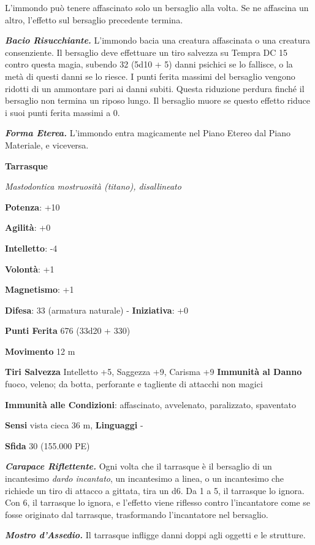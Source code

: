 \begin{multicols}{2}
L'immondo può tenere affascinato solo un bersaglio alla volta. Se ne
affascina un altro, l'effetto sul bersaglio precedente termina.

\emph{\textbf{Bacio Risucchiante.}} L'immondo bacia una creatura
affascinata o una creatura consenziente. Il bersaglio deve effettuare un
tiro salvezza su Tempra DC 15 contro questa magia, subendo 32
(5d10 + 5) danni psichici se lo fallisce, o la metà di questi danni se
lo riesce. I punti ferita massimi del bersaglio vengono ridotti di un
ammontare pari ai danni subiti. Questa riduzione perdura finché il
bersaglio non termina un riposo lungo. Il bersaglio muore se questo
effetto riduce i suoi punti ferita massimi a 0.

\emph{\textbf{Forma Eterea.}} L'immondo entra magicamente nel Piano
Etereo dal Piano Materiale, e viceversa.

\textbf{Tarrasque}

\emph{Mastodontica mostruosità (titano), disallineato}

\textbf{Potenza}: +10

\textbf{Agilità}: +0

\textbf{Intelletto}: -4

\textbf{Volontà}: +1

\textbf{Magnetismo}: +1

\textbf{Difesa}: 33 (armatura naturale) - \textbf{Iniziativa}: +0

\textbf{Punti Ferita} 676 (33d20 + 330)

\textbf{Movimento} 12 m

\textbf{Tiri Salvezza} Intelletto +5, Saggezza +9, Carisma +9
\textbf{Immunità al Danno} fuoco, veleno; da botta, perforante e
tagliente di attacchi non magici

\textbf{Immunità alle Condizioni}: affascinato, avvelenato, paralizzato,
spaventato

\textbf{Sensi} vista cieca 36 m, 
\textbf{Linguaggi} -

\textbf{Sfida} 30 (155.000 PE)\smallskip

\emph{\textbf{Carapace Riflettente.}} Ogni volta che il tarrasque è il
bersaglio di un incantesimo \emph{dardo incantato}, un incantesimo a
linea, o un incantesimo che richiede un tiro di attacco a gittata, tira
un d6. Da 1 a 5, il tarrasque lo ignora. Con 6, il tarrasque lo ignora,
e l'effetto viene riflesso contro l'incantatore come se fosse originato
dal tarrasque, trasformando l'incantatore nel bersaglio.

\emph{\textbf{Mostro d'Assedio.}} Il tarrasque infligge danni doppi agli
oggetti e le strutture.


\end{multicols}
